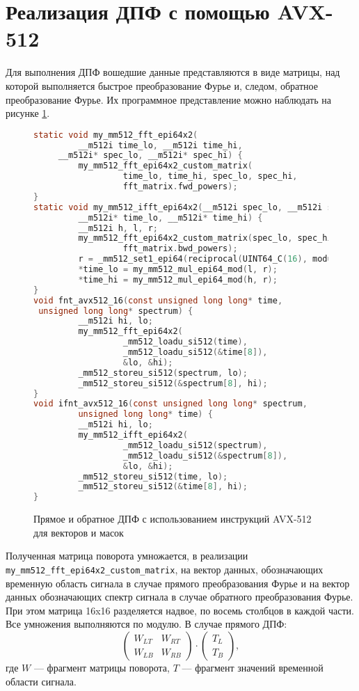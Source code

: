 \section{Реализация ДПФ с помощью AVX-512}
Для выполнения ДПФ вошедшие данные представляются в виде матрицы, над которой выполняется быстрое преобразование Фурье и, следом, обратное преобразование Фурье.
Их программное представление можно наблюдать на рисунке \ref{fig: avx512 nnt}.
\begin{figure}[ht]
\centering
\begin{lstlisting}[language=C]
static void my_mm512_fft_epi64x2(
         __m512i time_lo, __m512i time_hi,
	 __m512i* spec_lo, __m512i* spec_hi) {
         my_mm512_fft_epi64x2_custom_matrix(
                  time_lo, time_hi, spec_lo, spec_hi,
                  fft_matrix.fwd_powers);
}
static void my_mm512_ifft_epi64x2(__m512i spec_lo, __m512i spec_hi,
         __m512i* time_lo, __m512i* time_hi) {
         __m512i h, l, r;
         my_mm512_fft_epi64x2_custom_matrix(spec_lo, spec_hi, &l, &h,
                  fft_matrix.bwd_powers);
         r = _mm512_set1_epi64(reciprocal(UINT64_C(16), modulo));
         *time_lo = my_mm512_mul_epi64_mod(l, r);
         *time_hi = my_mm512_mul_epi64_mod(h, r);
}
void fnt_avx512_16(const unsigned long long* time,
 unsigned long long* spectrum) {
         __m512i hi, lo;
         my_mm512_fft_epi64x2(
                  _mm512_loadu_si512(time),
                  _mm512_loadu_si512(&time[8]),
                  &lo, &hi);
         _mm512_storeu_si512(spectrum, lo);
         _mm512_storeu_si512(&spectrum[8], hi);
}
void ifnt_avx512_16(const unsigned long long* spectrum,
         unsigned long long* time) {
         __m512i hi, lo;
         my_mm512_ifft_epi64x2(
                  _mm512_loadu_si512(spectrum),
                  _mm512_loadu_si512(&spectrum[8]),
                  &lo, &hi);
         _mm512_storeu_si512(time, lo);
         _mm512_storeu_si512(&time[8], hi);
}
\end{lstlisting}
\caption{Прямое и обратное ДПФ с использованием инструкций AVX-512 для векторов и масок}
\label{fig: avx512 nnt}
\end{figure}

Полученная матрица поворота умножается, в реализации \verb+my_mm512_fft_epi64x2_custom_matrix+, на вектор данных, обозначающих временную область сигнала в случае прямого преобразования Фурье и на вектор данных обозначающих спектр сигнала в случае обратного преобразования Фурье.
При этом матрица 16x16 разделяется надвое, по восемь столбцов в каждой части.
Все умножения выполняются по модулю.
В случае прямого ДПФ:
$$
\begin{pmatrix}
W_{LT} & W_{RT} \\
W_{LB} & W_{RB}
\end{pmatrix}
\cdot
\begin{pmatrix}
T_L \\
T_B
\end{pmatrix},
$$
где $W$ –-- фрагмент матрицы поворота, $T$ –-- фрагмент значений временной области сигнала.

